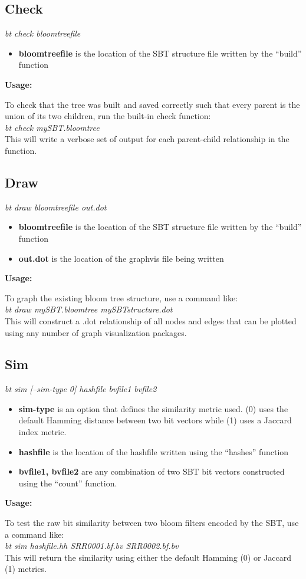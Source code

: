 \documentclass{article}
\begin{document}
\subsection{Check}
\textit{bt check bloomtreefile}
\begin{itemize}
\item \textbf{bloomtreefile} is the location of the SBT structure file written by the ``build'' function
\end{itemize}
\textbf{Usage:}

To check that the tree was built and saved correctly such that every parent is the union of its two children, run the built-in check function: \\

\textit{bt check mySBT.bloomtree} \\

This will write a verbose set of output for each parent-child relationship in the function.

\subsection{Draw}
\textit{bt draw bloomtreefile out.dot}
\begin{itemize}
\item \textbf{bloomtreefile} is the location of the SBT structure file written by the ``build'' function
\item \textbf{out.dot} is the location of the graphvis file being written
\end{itemize}
\textbf{Usage:}

To graph the existing bloom tree structure, use a command like: \\

\textit{bt draw mySBT.bloomtree mySBTstructure.dot} \\

This will construct a .dot relationship of all nodes and edges that can be plotted using any number of graph visualization packages. %


\subsection{Sim}
\textit{bt sim [--sim-type 0] hashfile bvfile1 bvfile2}
\begin{itemize}
\item \textbf{sim-type} is an option that defines the similarity metric used. (0) uses the default Hamming distance between two bit vectors while (1) uses a Jaccard index metric.
\item \textbf{hashfile} is the location of the hashfile written using the ``hashes'' function
\item \textbf{bvfile1, bvfile2} are any combination of two SBT bit vectors constructed using the ``count'' function.
\end{itemize}
\textbf{Usage:}

To test the raw bit similarity between two bloom filters encoded by the SBT, use a command like: \\

\textit{bt sim hashfile.hh SRR0001.bf.bv SRR0002.bf.bv} \\

This will return the similarity using either the default Hamming (0) or Jaccard (1) metrics.
\end{document}
